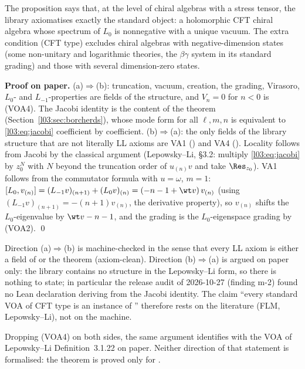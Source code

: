 \begin{physics}
The proposition says that, at the level of chiral algebras with a stress tensor, the library
axiomatises exactly the standard object: a holomorphic CFT chiral algebra whose spectrum of
$L_0$ is nonnegative with a unique vacuum. The extra condition (CFT type) excludes chiral
algebras with negative-dimension states (some non-unitary and logarithmic theories, the
$\beta\gamma$ system in its standard grading) and those with several dimension-zero states.
\end{physics}

\textbf{Proof on paper.} (a)$\Rightarrow$(b): truncation, vacuum, creation, the grading, Virasoro,
$L_0$- and $L_{-1}$-properties are fields of the structure, and $V_n=0$ for $n<0$ is (VOA4). The
Jacobi identity is the content of the theorem  (Section~\ref{l03:sec:borcherds}), whose
mode form for all $\ell,m,n$ is equivalent to \eqref{l03:eq:jacobi} coefficient by coefficient.
(b)$\Rightarrow$(a): the only fields of the library structure that are not literally LL axioms are
VA1 () and VA4 (). Locality follows from Jacobi by the
classical argument (Lepowsky--Li, §3.2: multiply \eqref{l03:eq:jacobi} by $z_0^N$ with $N$ beyond the
truncation order of $u_{(n)}v$ and take $\Res_{z_0}$). VA1 follows from the commutator formula with
$u = \omega$, $m = 1$: $[L_0,v_{(n)}] = (L_{-1}v)_{(n+1)} + (L_0v)_{(n)} = (-n-1+\wt v)\,v_{(n)}$
(using $(L_{-1}v)_{(n+1)} = -(n+1)v_{(n)}$, the derivative property), so $v_{(n)}$ shifts the
$L_0$-eigenvalue by $\wt v-n-1$, and the grading is the $L_0$-eigenspace grading by
(VOA2). \qed

\begin{status}
Direction (a)$\Rightarrow$(b) is machine-checked in the sense that every LL axiom is either a field
of  or the theorem 
(axiom-clean). Direction (b)$\Rightarrow$(a) is argued on paper only: the library contains no
structure in the Lepowsky--Li form, so there is nothing to state; in particular the release audit of 2026-10-27
(finding m-2) found no Lean declaration deriving  from the Jacobi identity. The claim ``every standard VOA of
CFT type is an instance of '' therefore rests on the literature (FLM, Lepowsky--Li), not on
the machine.
\end{status}

\begin{remark}
Dropping (VOA4) on both sides, the same argument identifies  with the VOA of
Lepowsky--Li Definition~3.1.22 on paper. Neither direction of that statement is formalised: the theorem
 is proved only for .
\end{remark}

